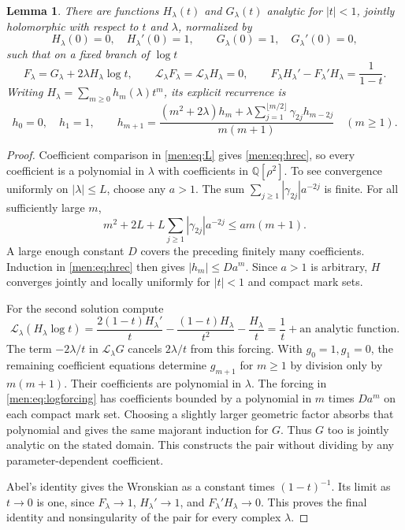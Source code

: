 \documentclass[11pt,letterpaper]{article}
\newtheorem{lemma}[theorem]{Lemma}
\theoremstyle{remark}\newtheorem{remark}[theorem]{Remark}
\begin{document}
\begin{lemma}\label{men:lem:frobenius}
There are functions $H_\lambda(t)$ and $G_\lambda(t)$ analytic for $|t|<1$, jointly holomorphic with respect to $t$ and $\lambda$, normalized by
\[
 H_\lambda(0)=0,\quad H_\lambda'(0)=1,\qquad
 G_\lambda(0)=1,\quad G_\lambda'(0)=0,
\]
such that on a fixed branch of $\log t$
\begin{equation}\label{men:eq:fundamental}
 F_\lambda=G_\lambda+2\lambda H_\lambda\log t,\qquad
 \mathcal L_\lambda F_\lambda=\mathcal L_\lambda H_\lambda=0,
 \qquad F_\lambda H_\lambda'-F_\lambda'H_\lambda=\frac1{1-t}.
\end{equation}
Writing $H_\lambda=\sum_{m\ge0}h_m(\lambda)t^m$, its explicit recurrence is
\begin{equation}\label{men:eq:hrec}
 h_0=0,\quad h_1=1,\qquad
 h_{m+1}=\frac{(m^2+2\lambda)h_m+
 \lambda\sum_{j=1}^{\lfloor m/2\rfloor}\gamma_{2j}h_{m-2j}}{m(m+1)}
 \quad(m\ge1).
\end{equation}
\end{lemma}
\begin{proof}
Coefficient comparison in \eqref{men:eq:L} gives \eqref{men:eq:hrec}, so every coefficient is a polynomial in $\lambda$ with coefficients in $\mathbb Q[\rho^2]$. To see convergence uniformly on $|\lambda|\le L$, choose any $a>1$. The sum $\sum_{j\ge1}|\gamma_{2j}|a^{-2j}$ is finite. For all sufficiently large $m$,
\[
 m^2+2L+L\sum_{j\ge1}|\gamma_{2j}|a^{-2j}\le a m(m+1).
\]
A large enough constant $D$ covers the preceding finitely many coefficients. Induction in \eqref{men:eq:hrec} then gives $|h_m|\le Da^m$. Since $a>1$ is arbitrary, $H$ converges jointly and locally uniformly for $|t|<1$ and compact mark sets.

For the second solution compute
\begin{equation}\label{men:eq:logforcing}
 \mathcal L_\lambda(H_\lambda\log t)
 =\frac{2(1-t)H_\lambda'}t
  -\frac{(1-t)H_\lambda}{t^2}-\frac{H_\lambda}t
 =\frac1t+\text{an analytic function}.
\end{equation}
The term $-2\lambda/t$ in $\mathcal L_\lambda G$ cancels $2\lambda/t$ from this forcing. With $g_0=1,g_1=0$, the remaining coefficient equations determine $g_{m+1}$ for $m\ge1$ by division only by $m(m+1)$. Their coefficients are polynomial in $\lambda$. The forcing in \eqref{men:eq:logforcing} has coefficients bounded by a polynomial in $m$ times $Da^m$ on each compact mark set. Choosing a slightly larger geometric factor absorbs that polynomial and gives the same majorant induction for $G$. Thus $G$ too is jointly analytic on the stated domain. This constructs the pair without dividing by any parameter-dependent coefficient.

Abel's identity gives the Wronskian as a constant times $(1-t)^{-1}$. Its limit as $t\to0$ is one, since $F_\lambda\to1$, $H_\lambda'\to1$, and $F_\lambda'H_\lambda\to0$. This proves the final identity and nonsingularity of the pair for every complex $\lambda$.
\end{proof}
\end{document}
